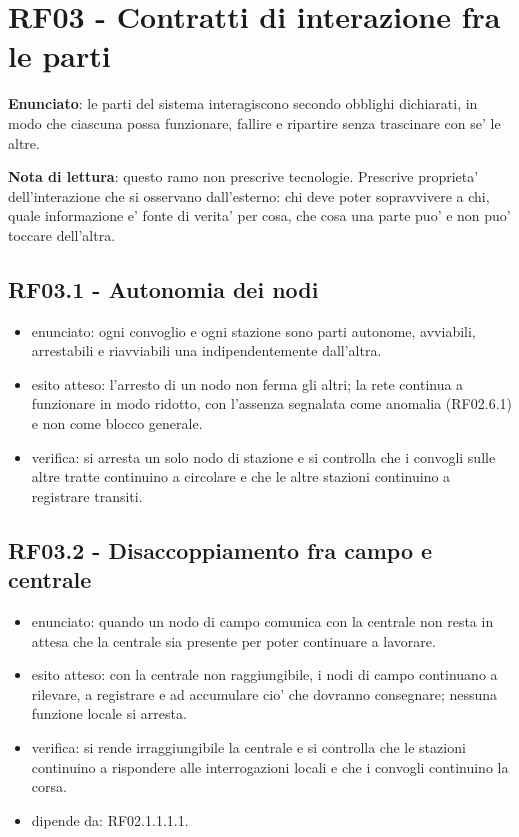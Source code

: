 \documentclass[11pt]{article}
\begin{document}
\section{RF03 - Contratti di interazione fra le parti}
\label{sec:orgeab4f29}

\textbf{Enunciato}: le parti del sistema interagiscono secondo obblighi dichiarati, in modo che ciascuna
possa funzionare, fallire e ripartire senza trascinare con se' le altre.

\textbf{Nota di lettura}: questo ramo non prescrive tecnologie. Prescrive proprieta' dell'interazione che si
osservano dall'esterno: chi deve poter sopravvivere a chi, quale informazione e' fonte di verita' per
cosa, che cosa una parte puo' e non puo' toccare dell'altra.
\subsection{RF03.1 - Autonomia dei nodi}
\label{sec:orga36e343}
\begin{itemize}
\item enunciato: ogni convoglio e ogni stazione sono parti autonome, avviabili, arrestabili e riavviabili
una indipendentemente dall'altra.
\item esito atteso: l'arresto di un nodo non ferma gli altri; la rete continua a funzionare in modo
ridotto, con l'assenza segnalata come anomalia (RF02.6.1) e non come blocco generale.
\item verifica: si arresta un solo nodo di stazione e si controlla che i convogli sulle altre tratte
continuino a circolare e che le altre stazioni continuino a registrare transiti.
\end{itemize}
\subsection{RF03.2 - Disaccoppiamento fra campo e centrale}
\label{sec:org8c3bb05}
\begin{itemize}
\item enunciato: quando un nodo di campo comunica con la centrale non resta in attesa che la centrale sia
presente per poter continuare a lavorare.
\item esito atteso: con la centrale non raggiungibile, i nodi di campo continuano a rilevare, a
registrare e ad accumulare cio' che dovranno consegnare; nessuna funzione locale si arresta.
\item verifica: si rende irraggiungibile la centrale e si controlla che le stazioni continuino a
rispondere alle interrogazioni locali e che i convogli continuino la corsa.
\item dipende da: RF02.1.1.1.1.
\end{itemize}
\end{document}
